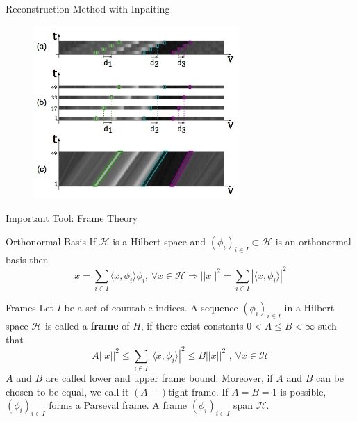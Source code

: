 \begin{frame}{Reconstruction Method with Inpaiting}
\begin{block}{}
\begin{figure}[h!]
\includegraphics[width=0.7\textwidth]{../../Diagrams/sparse_EPI.jpg}
\end{figure}
\end{block}
\end{frame}

\begin{frame}{Important Tool: Frame Theory}

\begin{block}{Orthonormal Basis}
If $\mathcal{H}$ is a Hilbert space and $(\phi_i)_{i\in I}\subset \mathcal{H}$ is an orthonormal basis then 
$$
x = \sum_{i\in I}\langle x,\phi_i\rangle \phi_i\text{,  }\forall x\in\mathcal{H}
\Longrightarrow
||x||^2=\sum_{i\in I}|\langle x,\phi_i\rangle|^2
$$
\end{block}

\begin{block}{Frames}
Let $I$ be a set of countable indices. A sequence $(\phi_i)_{i\in I}$ in a Hilbert space $\mathcal{H}$ is called a \textbf{frame} of $H$, if there exist constants $0< A\leq B<\infty$ such that
$$
A||x||^2\leq\sum_{i\in I}|\langle x,\phi_i\rangle|^2\leq B||x||^2 \text{  ,  } \forall x\in\mathcal{H}
$$
$A$ and $B$ are called lower and upper frame bound. Moreover, if $A$ and $B$ can be chosen to be equal, we call it $(A-)$tight frame. If $A=B=1$ is possible, $(\phi_i)_{i\in I}$ forms a Parseval frame. A frame $(\phi_i)_{i\in I}$ span $\mathcal{H}$. 
\end{block}
\end{frame}

